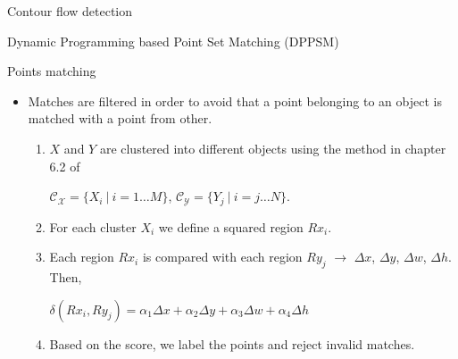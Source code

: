 \begin{frame}{Contour flow detection}
\begin{overlayarea}{\textwidth}{\textheight}
{\begin{block}{Dynamic Programming based Point Set Matching (DPPSM)}
\begin{itemize}
\begin{itemize}
	  \end{itemize}
	\end{itemize}
      \end{block}
      }
  \end{overlayarea}
\end{frame}

\begin{frame}{Points matching}
  \begin{itemize}
   \item Matches are filtered in order to avoid that a point belonging to an object is matched with a point from other.
   \begin{enumerate}
    \item $X$ and $Y$ are clustered into different objects using the method in chapter 6.2 of \cite{rusu2009semantic}\\ \begin{center}
      $\mathcal{C_X} = \{ X_i ~|~ i=1 \dots M \}$, $\mathcal{C_Y} = \{ Y_j ~|~ i=j \dots N \}$.
    \end{center}
    \item For each cluster $X_i$ we define a squared region $Rx_i$.
    \item Each region $Rx_i$ is compared with each region $Ry_j$ \citep{siebel2003design} $\rightarrow$ $\varDelta x$, $\varDelta y$, $\varDelta w$, $\varDelta h$. Then,\\
    \begin{center}
     $\delta (Rx_i, Ry_j) = \alpha_1 \varDelta x + \alpha_2 \varDelta y + \alpha_3 \varDelta w + \alpha_4 \varDelta h$
    \end{center}
    \item Based on the score, we label the points and reject invalid matches.
   \end{enumerate}
  \end{itemize}
\end{frame}

